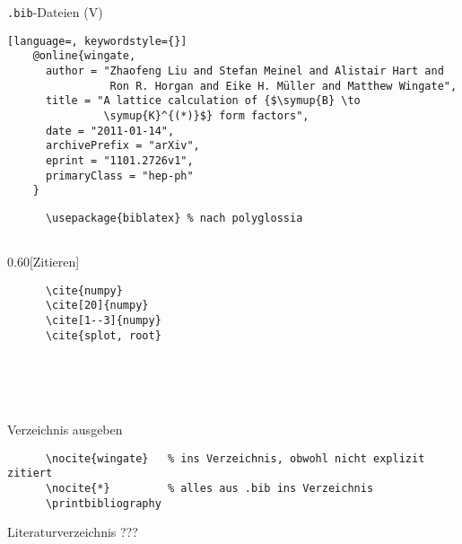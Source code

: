 \begin{frame}[fragile]{\texttt{.bib}-Dateien (V)}
  \begin{lstlisting}[language=, keywordstyle={}]
    @online{wingate,
      author = "Zhaofeng Liu and Stefan Meinel and Alistair Hart and
                Ron R. Horgan and Eike H. Müller and Matthew Wingate",
      title = "A lattice calculation of {$\symup{B} \to
               \symup{K}^{(*)}$} form factors",
      date = "2011-01-14",
      archivePrefix = "arXiv",
      eprint = "1101.2726v1",
      primaryClass = "hep-ph"
    }
  \end{lstlisting}
  \vspace{1em}
\end{frame}

\begin{frame}[fragile]{\BibLaTeX\hfill{}}
  \begin{Packages}
    \begin{lstlisting}
      \usepackage{biblatex} % nach polyglossia
      
    \end{lstlisting}
  \end{Packages}
  \begin{CodeExample}{0.60}[Zitieren]
    \begin{lstlisting}
      \cite{numpy}
      \cite[20]{numpy}
      \cite[1--3]{numpy}
      \cite{splot, root}
    \end{lstlisting}
  \CodeResult
    \cite{numpy} \\
    \cite[20]{numpy} \\
    \cite[1--3]{numpy} \\
    \cite{splot, root}
  \end{CodeExample}
  \begin{block}{Verzeichnis ausgeben}
    \begin{lstlisting}
      \nocite{wingate}   % ins Verzeichnis, obwohl nicht explizit zitiert
      \nocite{*}         % alles aus .bib ins Verzeichnis
      \printbibliography
    \end{lstlisting}
  \end{block}
\end{frame}

\begin{frame}{Literaturverzeichnis}
  \centering
  \pause
  \Huge ???
\end{frame}

